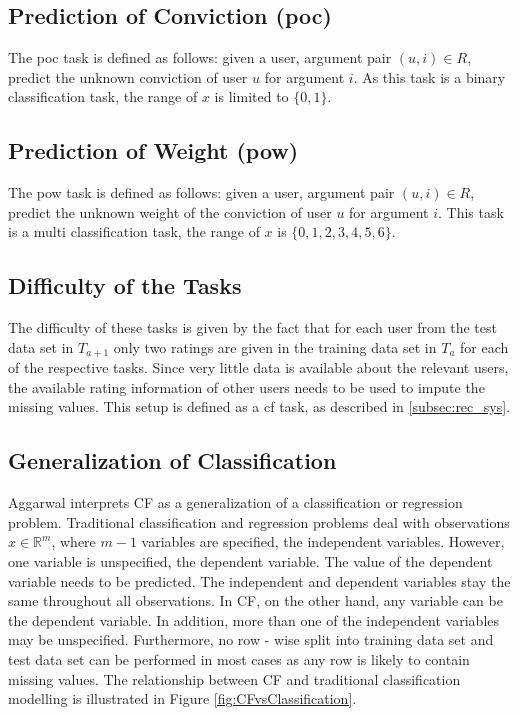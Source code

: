\subsection{Prediction of Conviction (\acrshort{poc})}
The \acrshort{poc} task is defined as follows: given a user, argument pair $(u,i) \in R$, predict the unknown conviction of user $u$ for argument $i$. As this task is a binary classification task, the range of $x$ is limited to $\{0, 1\}$.\\
\subsection{Prediction of Weight (\acrshort{pow})}
The \acrshort{pow} task is defined as follows: given a user, argument pair $(u,i) \in R$, predict the unknown weight of the conviction of user $u$ for argument $i$. This task is a multi classification task, the range of $x$ is $\{0, 1, 2, 3, 4, 5, 6\}$.\\
\subsection{Difficulty of the Tasks}
\label{sec:difficulty}
The difficulty of these tasks is given by the fact that for each user from the test data set in $T_{a+1}$  only two ratings are given in the training data set in $T_{a}$ for each of the respective tasks. Since very little data is available about the relevant users, the available rating information of other users needs to be used to impute the missing values. This setup is defined as a \acrshort{cf} task, as described in \ref{subsec:rec_sys}.\\
\subsection{Generalization of Classification}
Aggarwal \cite{aggarwal2016recommender} interprets CF as a generalization of a classification or regression problem. Traditional classification and regression problems deal with observations $x \in \mathbb{R}^{m}$, where $m - 1$ variables are specified, the independent variables. However, one variable is unspecified, the dependent variable. The value of the dependent variable needs to be predicted. The independent and dependent variables stay the same throughout all observations. In CF, on the other hand, any variable can be the dependent variable. In addition, more than one of the independent variables may be unspecified. Furthermore, no row - wise split into training data set and test data set can be performed in most cases as any row is likely to contain missing values. The relationship between CF and traditional classification modelling is illustrated in Figure \ref{fig:CFvsClassification}.

